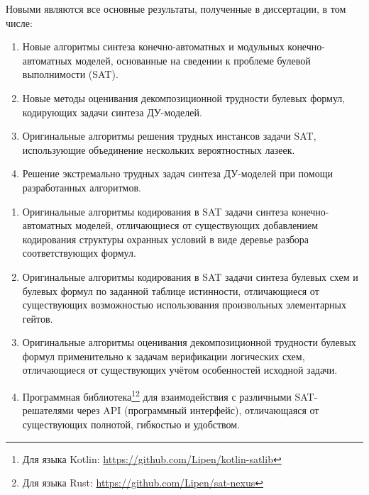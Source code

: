 {\novelty}
Новыми являются все основные результаты, полученные в диссертации, в том числе:
\begin{enumerate}[beginpenalty=10000]
    \item Новые алгоритмы синтеза конечно-автоматных и модульных конечно-автоматных моделей, основанные на сведении к проблеме булевой выполнимости (SAT).

    \item Новые методы оценивания декомпозиционной трудности булевых формул, кодирующих задачи синтеза ДУ-моделей.

    \item Оригинальные алгоритмы решения трудных инстансов задачи SAT, использующие объединение нескольких вероятностных лазеек.

    \item Решение экстремально трудных задач синтеза ДУ-моделей при помощи разработанных алгоритмов.
\end{enumerate}


\begin{enumerate}[beginpenalty=10000]
    \item Оригинальные алгоритмы кодирования в SAT задачи синтеза конечно-автоматных моделей, отличающиеся от существующих добавлением кодирования структуры охранных условий в виде деревье разбора соответствующих формул.

    \item Оригинальные алгоритмы кодирования в SAT задачи синтеза булевых схем и булевых формул по заданной таблице истинности, отличающиеся от существующих возможностью использования произвольных элементарных гейтов.

    \item Оригинальные алгоритмы оценивания декомпозиционной трудности булевых формул применительно к задачам верификации логических схем, отличающиеся от существующих учётом особенностей исходной задачи.

    \item Программная библиотека\footnote{Для языка Kotlin: \url{https://github.com/Lipen/kotlin-satlib}}\footnote{Для языка Rust: \url{https://github.com/Lipen/sat-nexus}} для взаимодействия с различными SAT-решателями через API (программный интерфейс), отличающаяся от существующих полнотой, гибкостью и удобством.



\end{enumerate}


